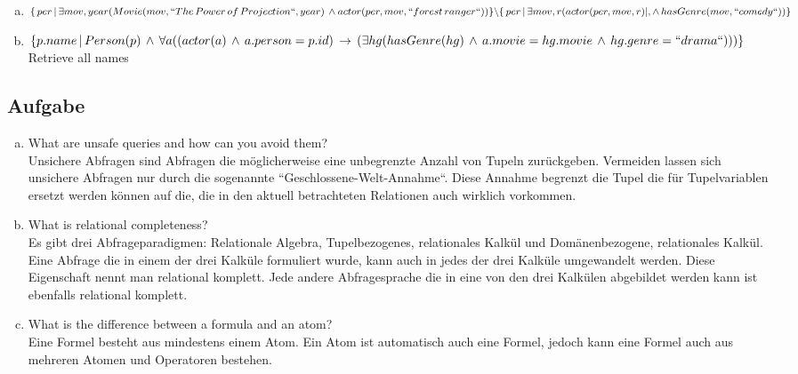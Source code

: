 \documentclass[11pt,a4paper,DIV=9]{scrartcl}
\newcounter{temp}
\newcommand{\aufgabe}[1]{
  \setcounter{temp}{\value{subsection}}
  \setcounter{subsection}{#1}
  \addtocounter{subsection}{-1}
  \subsection{Aufgabe}
  \setcounter{subsection}{\value{temp}}
}
\begin{document}
 \begin{enumerate}[a)]
   \item 
   $ 
   \{\, per \, | \, \exists mov, year (\\ 
   Movie(mov, ``The \, Power \, of \, Projection``, year) \,  \wedge \, \\actor(per,mov, ``forest \, ranger``)\\ 
   ) \} \backslash \{ \,per \, | \, \exists mov, r(actor(per, mov, r) |, \wedge \, hasGenre(mov, ``comedy``))\}
   $
   \item 
   $
   \{p.name \, | \, Person(p) \, \wedge \, \forall a(\\  
   (actor(a) \, \wedge \, a.person=p.id) \, \rightarrow \, (\\
   \exists hg(hasGenre(hg) \, \wedge \, a.movie=hg.movie \, \wedge \, hg.genre=``drama``)
   \\)\\)\}
   $
   Retrieve all names
 \end{enumerate}
\aufgabe{3}
\begin{enumerate}[a)]
 \item What are unsafe queries and how can you avoid them? \\
 Unsichere Abfragen sind Abfragen die m\"oglicherweise eine unbegrenzte Anzahl von Tupeln zur\"uckgeben. Vermeiden lassen sich unsichere Abfragen nur durch die sogenannte ``Geschlossene-Welt-Annahme``. Diese Annahme begrenzt die Tupel die f\"ur Tupelvariablen ersetzt werden k\"onnen auf die, die in den aktuell betrachteten Relationen auch wirklich vorkommen.
 \item What is relational completeness? \\
 Es gibt drei Abfrageparadigmen: Relationale Algebra, Tupelbezogenes, relationales Kalk\"ul und Dom\"anenbezogene, relationales Kalk\"ul. Eine Abfrage die in einem der drei Kalk\"ule formuliert wurde, kann auch in jedes der drei Kalk\"ule umgewandelt werden. Diese Eigenschaft nennt man relational komplett. Jede andere Abfragesprache die in eine von den drei Kalk\"ulen abgebildet werden kann ist ebenfalls relational komplett.
 \item What is the difference between a formula and an atom? \\
 Eine Formel besteht aus mindestens einem Atom. Ein Atom ist automatisch auch eine Formel, jedoch kann eine Formel auch aus mehreren Atomen und Operatoren bestehen.
\end{enumerate}
\end{document}
